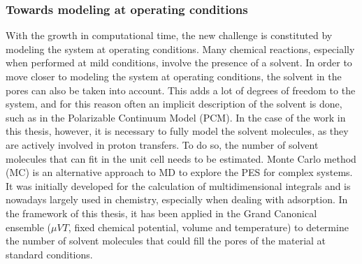 \subsubsection*{Towards modeling at operating conditions}
With the growth in computational time, the new challenge is constituted by modeling the system at operating conditions. Many chemical reactions, especially when performed at mild conditions, involve the presence of a solvent. In order to move closer to modeling the system at operating conditions, the solvent in the pores can also be taken into account. This adds a lot of degrees of freedom to the system, and for this reason often an implicit description of the solvent is done, such as in the Polarizable Continuum Model (PCM)\cite{cances1997new}. In the case of the work in this thesis, however, it is necessary to fully model the solvent molecules, as they are actively involved in proton transfers. To do so, the number of solvent molecules that can fit in the unit cell needs to be estimated. Monte Carlo method (MC) is an alternative approach to MD to explore the PES for complex systems. It was initially developed for the calculation of multidimensional integrals and is nowadays largely used in chemistry, especially when dealing with adsorption. In the framework of this thesis, it has been applied in the Grand Canonical ensemble ($\mu VT$, fixed chemical potential, volume and temperature) to determine the number of solvent molecules that could fill the pores of the material at standard conditions.

